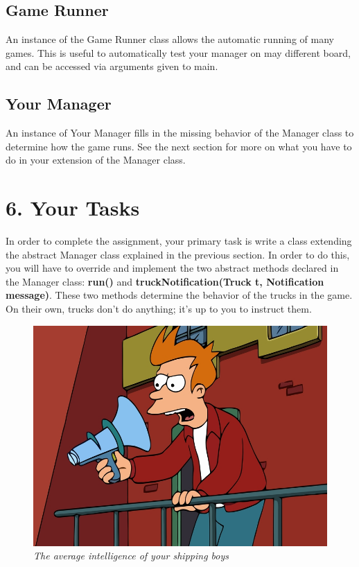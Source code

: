 \documentclass[11pt]{article}
\begin{document}
\subsection{Game Runner}
An instance of the Game Runner class allows the automatic running of many games. This is useful to automatically test your manager on may different board, and can be accessed via arguments given to main.
\subsection{Your Manager}
An instance of Your Manager fills in the missing behavior of the Manager class to determine how the game runs. See the next section for more on what you have to do in your extension of the Manager class.

\newpage
\section{6. Your Tasks}
In order to complete the assignment, your primary task is write a class extending the abstract Manager class explained in the previous section. In order to do this, you will have to override and implement the two abstract methods declared in the Manager class: \textbf{run()} and \textbf{truckNotification(Truck t, Notification message)}. These two methods determine the behavior of the trucks in the game. On their own, trucks don't do anything; it's up to you to instruct them.\\

\begin{figure}[h]
\centerline{\includegraphics[scale=0.4]{fry.jpg}} 
\caption{\em{The average intelligence of your shipping boys}}
\end{figure}
\end{document}

